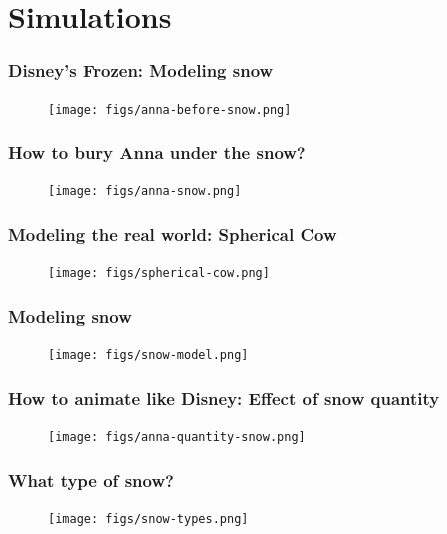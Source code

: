 \documentclass[notes]{beamer}
\begin{document}
\section{Simulations}
\begin{frame}
\frametitle{Disney's Frozen: Modeling snow}
\begin{figure}[ht]
	\centering
	\texttt{[image: figs/anna-before-snow.png]}
\end{figure}
\end{frame}

\begin{frame}
	\frametitle{\faQuestionCircleO  How to bury Anna under the snow?}
	\begin{figure}[ht]
		\centering
		\texttt{[image: figs/anna-snow.png]}
		
	\end{figure}
\end{frame}

\begin{frame}
	\frametitle{Modeling the real world: Spherical Cow}
	\begin{figure}[ht]
		\centering
		\texttt{[image: figs/spherical-cow.png]}
	\end{figure}
\end{frame}

\begin{frame}
	\frametitle{Modeling snow}
	\begin{figure}[ht]
		\centering
		\texttt{[image: figs/snow-model.png]}
	\end{figure}
\end{frame}

\begin{frame}
	\frametitle{How to animate like Disney: Effect of snow quantity}
	\begin{figure}[ht]
		\centering
		\texttt{[image: figs/anna-quantity-snow.png]}
	\end{figure}
\end{frame}

\begin{frame}
	\frametitle{What type of snow?}
	\begin{figure}[ht]
		\centering
		\texttt{[image: figs/snow-types.png]}
	\end{figure}
\end{frame}
\end{document}
